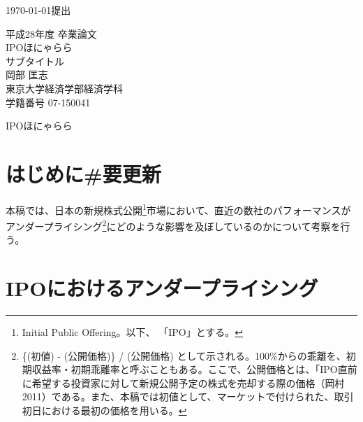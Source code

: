 \documentclass{jsarticle}
\begin{document}
\renewcommand\thefootnote{\arabic{footnote})}



{\Large \today 提出}\\ %

\begin{center}
\vspace{120truept}
{\huge 平成28年度 卒業論文\\[10mm]
IPOほにゃらら}\\ %
\vspace{10truept}
{\Large サブタイトル}\\ %
\vspace{120truept}
{\huge 岡部 匡志\\
\vspace{50truept}
東京大学経済学部経済学科\\
\vspace{50truept}
学籍番号 07-150041}\\ %

\end{center}
\newpage
\begin{center}
{\Large IPOほにゃらら}\\ %
\end{center}

\tableofcontents

\vspace{120truept}
\section{はじめに\#要更新}
本稿では、日本の新規株式公開\footnote[1]{Initial Public Offering。以下、 「IPO」とする。}市場において、直近の数社のパフォーマンスがアンダープライシング\footnote[2]{\{(初値) - (公開価格)\} / (公開価格) として示される。100\%からの乖離を、初期収益率・初期乖離率と呼ぶこともある。ここで、公開価格とは、「IPO直前に希望する投資家に対して新規公開予定の株式を売却する際の価格（岡村 2011\cite{okamura}）である。また、本稿では初値として、マーケットで付けられた、取引初日における最初の価格を用いる。}にどのような影響を及ぼしているのかについて考察を行う。
\section{IPOにおけるアンダープライシング}
\end{document}
